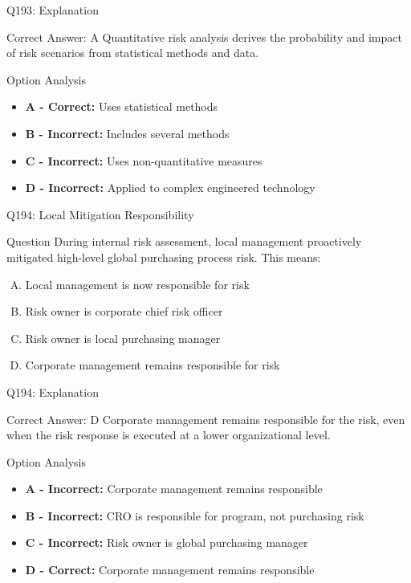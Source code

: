 \documentclass{beamer}
\begin{document}
	\begin{frame}{Q193: Explanation}
		\begin{block}{Correct Answer: A}
			Quantitative risk analysis derives the probability and impact of risk scenarios from statistical methods and data.
		\end{block}
		\begin{block}{Option Analysis}
			\begin{itemize}
				\item \textbf{A - Correct:} Uses statistical methods
				\item \textbf{B - Incorrect:} Includes several methods
				\item \textbf{C - Incorrect:} Uses non-quantitative measures
				\item \textbf{D - Incorrect:} Applied to complex engineered technology
			\end{itemize}
		\end{block}
	\end{frame}
	
	\begin{frame}{Q194: Local Mitigation Responsibility}
		\begin{block}{Question}
			During internal risk assessment, local management proactively mitigated high-level global purchasing process risk. This means:
		\end{block}
		\begin{enumerate}[(A)]
			\item Local management is now responsible for risk
			\item Risk owner is corporate chief risk officer
			\item Risk owner is local purchasing manager
			\item Corporate management remains responsible for risk
		\end{enumerate}
	\end{frame}
	
	\begin{frame}{Q194: Explanation}
		\begin{block}{Correct Answer: D}
			Corporate management remains responsible for the risk, even when the risk response is executed at a lower organizational level.
		\end{block}
		\begin{block}{Option Analysis}
			\begin{itemize}
				\item \textbf{A - Incorrect:} Corporate management remains responsible
				\item \textbf{B - Incorrect:} CRO is responsible for program, not purchasing risk
				\item \textbf{C - Incorrect:} Risk owner is global purchasing manager
				\item \textbf{D - Correct:} Corporate management remains responsible
			\end{itemize}
		\end{block}
	\end{frame}
	
\end{document}
